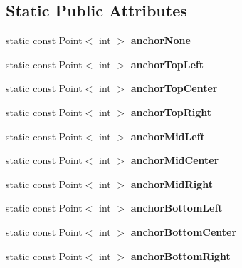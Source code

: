 \subsection*{Static Public Attributes}
\begin{DoxyCompactItemize}
\item 
static const Point$<$ int $>$ {\bfseries anchor\+None}\hypertarget{class_resizable_layout_abce74413941372b048841736701d502b}{}\label{class_resizable_layout_abce74413941372b048841736701d502b}

\item 
static const Point$<$ int $>$ {\bfseries anchor\+Top\+Left}\hypertarget{class_resizable_layout_a90210bba2e6bf70f0809e6247f8456fd}{}\label{class_resizable_layout_a90210bba2e6bf70f0809e6247f8456fd}

\item 
static const Point$<$ int $>$ {\bfseries anchor\+Top\+Center}\hypertarget{class_resizable_layout_a8a3531e2f855d5f0bd1853810ec6433d}{}\label{class_resizable_layout_a8a3531e2f855d5f0bd1853810ec6433d}

\item 
static const Point$<$ int $>$ {\bfseries anchor\+Top\+Right}\hypertarget{class_resizable_layout_a1d575831c569628868e960db24f37397}{}\label{class_resizable_layout_a1d575831c569628868e960db24f37397}

\item 
static const Point$<$ int $>$ {\bfseries anchor\+Mid\+Left}\hypertarget{class_resizable_layout_a4d19f1f0f2f03555f9dd88f5aaf591a4}{}\label{class_resizable_layout_a4d19f1f0f2f03555f9dd88f5aaf591a4}

\item 
static const Point$<$ int $>$ {\bfseries anchor\+Mid\+Center}\hypertarget{class_resizable_layout_ad1ab269eda949795945f8b989c9c8ba5}{}\label{class_resizable_layout_ad1ab269eda949795945f8b989c9c8ba5}

\item 
static const Point$<$ int $>$ {\bfseries anchor\+Mid\+Right}\hypertarget{class_resizable_layout_a01a1484282b237f3275003ee4808ed51}{}\label{class_resizable_layout_a01a1484282b237f3275003ee4808ed51}

\item 
static const Point$<$ int $>$ {\bfseries anchor\+Bottom\+Left}\hypertarget{class_resizable_layout_a1b288f975b0c381a804481f22e2d210d}{}\label{class_resizable_layout_a1b288f975b0c381a804481f22e2d210d}

\item 
static const Point$<$ int $>$ {\bfseries anchor\+Bottom\+Center}\hypertarget{class_resizable_layout_a778d3ca9fec5a324830da19b3bbe11d0}{}\label{class_resizable_layout_a778d3ca9fec5a324830da19b3bbe11d0}

\item 
static const Point$<$ int $>$ {\bfseries anchor\+Bottom\+Right}\hypertarget{class_resizable_layout_afa82aa0e719c90476a7999e755758149}{}\label{class_resizable_layout_afa82aa0e719c90476a7999e755758149}

\end{DoxyCompactItemize}
